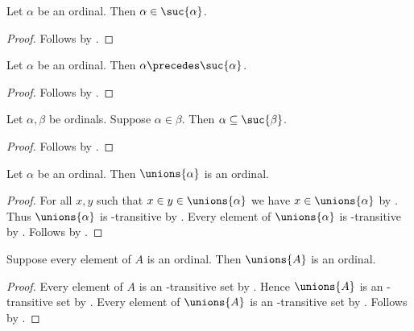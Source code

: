 \begin{proposition}\label{ordinal_in_suc}
    Let $\alpha$ be an ordinal.
    Then $\alpha\in\suc{\alpha}$.
\end{proposition}
\begin{proof}
    Follows by .
\end{proof}

\begin{corollary}\label{ordinal_precedes_suc}
    Let $\alpha$ be an ordinal.
    Then $\alpha\precedes \suc{\alpha}$.
\end{corollary}
\begin{proof}
    Follows by .
\end{proof}

\begin{proposition}\label{ordinal_elem_implies_subset_of_suc}
    Let $\alpha,\beta$ be ordinals.
    Suppose $\alpha\in\beta$.
    Then $\alpha\subseteq\suc{\beta}$.
\end{proposition}
\begin{proof}
    Follows by .
\end{proof}

\begin{proposition}\label{unions_of_ordinal_is_ordinal}
    Let $\alpha$ be an ordinal.
    Then $\unions{\alpha}$ is an ordinal.
\end{proposition}
\begin{proof}
    For all $x, y$ such that $x\in y\in \unions{\alpha}$ we have $x\in \unions{\alpha}$
        by .
    Thus $\unions{\alpha}$ is \in-transitive by .
    Every element of $\unions{\alpha}$ is \in-transitive
        by .
    Follows by .
\end{proof}

\begin{proposition}\label{union_of_ordinals_is_ordinal}
    Suppose every element of $A$ is an ordinal.
    Then $\unions{A}$ is an ordinal.
\end{proposition}
\begin{proof}
    Every element of $A$ is an \in-transitive set by .
    Hence $\unions{A}$ is an \in-transitive set
        by .
    Every element of $\unions{A}$ is an \in-transitive set
        by .
    Follows by .
\end{proof}

